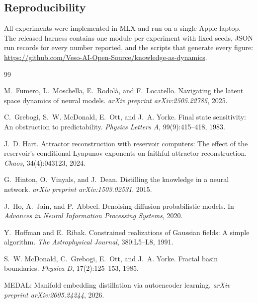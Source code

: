 \documentclass[11pt]{article}
\begin{document}
\subsection*{Reproducibility}

All experiments were implemented in MLX and run on a single Apple laptop. The released harness contains one module per experiment with fixed seeds, JSON run records for every number reported, and the scripts that generate every figure: \url{https://github.com/Veso-AI-Open-Source/knowledge-as-dynamics}.

\begin{thebibliography}{99}

M.~Fumero, L.~Moschella, E.~Rodol\`a, and F.~Locatello.
\newblock Navigating the latent space dynamics of neural models.
\newblock \emph{arXiv preprint arXiv:2505.22785}, 2025.

C.~Grebogi, S.~W. McDonald, E.~Ott, and J.~A. Yorke.
\newblock Final state sensitivity: An obstruction to predictability.
\newblock \emph{Physics Letters A}, 99(9):415--418, 1983.

J.~D. Hart.
\newblock Attractor reconstruction with reservoir computers: The effect of the reservoir's conditional Lyapunov exponents on faithful attractor reconstruction.
\newblock \emph{Chaos}, 34(4):043123, 2024.

G.~Hinton, O.~Vinyals, and J.~Dean.
\newblock Distilling the knowledge in a neural network.
\newblock \emph{arXiv preprint arXiv:1503.02531}, 2015.

J.~Ho, A.~Jain, and P.~Abbeel.
\newblock Denoising diffusion probabilistic models.
\newblock In \emph{Advances in Neural Information Processing Systems}, 2020.

Y.~Hoffman and E.~Ribak.
\newblock Constrained realizations of Gaussian fields: A simple algorithm.
\newblock \emph{The Astrophysical Journal}, 380:L5--L8, 1991.

S.~W. McDonald, C.~Grebogi, E.~Ott, and J.~A. Yorke.
\newblock Fractal basin boundaries.
\newblock \emph{Physica D}, 17(2):125--153, 1985.

MEDAL: Manifold embedding distillation via autoencoder learning.
\newblock \emph{arXiv preprint arXiv:2605.24244}, 2026.


\end{thebibliography}
\end{document}
